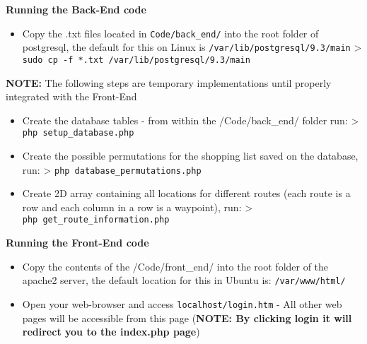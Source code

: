 \documentclass[10pt, a4paper, onecolumn]{scrartcl}
\begin{document}
	\textbf{Running the Back-End code} 
	
		\begin{itemize}[noitemsep]
			\item 	Copy the .txt files located in \texttt{Code/back\_end/} into the root
			folder of postgresql, the default for this on Linux is
			\texttt{/var/lib/postgresql/9.3/main} \textgreater{}
			\texttt{sudo\ cp\ -f\ *.txt\ /var/lib/postgresql/9.3/main}
		\end{itemize}
	
	\textbf{NOTE:} The following steps are temporary implementations until
	properly integrated with the Front-End 
	
		\begin{itemize}[noitemsep]
			\item 	Create the database tables - from within the /Code/back\_end/ folder
			run: \textgreater{} \texttt{php\ setup\_database.php}
			\item 	Create the possible permutations for the shopping list saved on the
			database, run: \textgreater{} \texttt{php\ database\_permutations.php}
			\item 	Create 2D array containing all locations for different routes (each
			route is a row and each column in a row is a waypoint), run:
			\textgreater{} \texttt{php\ get\_route\_information.php} 
		\end{itemize}
	
	\textbf{Running the Front-End code} 
	
	
		\begin{itemize}[noitemsep]
			\item 	Copy the contents of the /Code/front\_end/ into the root folder of the
			apache2 server, the default location for this in Ubuntu is: \texttt{/var/www/html/}
			\item 	Open your web-browser and access \texttt{localhost/login.htm} - All
			other web pages will be accessible from this page (\textbf{NOTE: By clicking login it will redirect you to the index.php page})
		\end{itemize}
		

	

	
\end{document}

